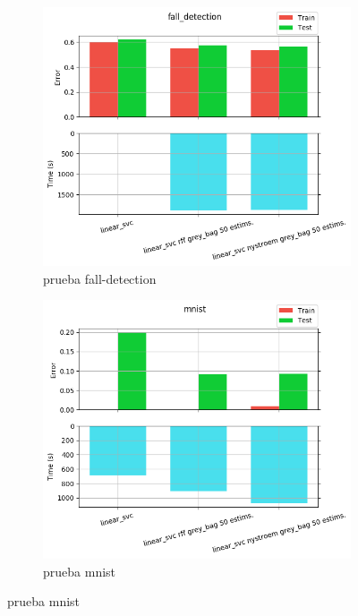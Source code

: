 \begin{figure}[ht]
  \centering
  \begin{subfigure}[b]{0.5\linewidth}
    \centering\includegraphics[width=\imgscale\linewidth]{Figures/2_7/fall_detection}
    \caption{prueba fall-detection}
    \label{fig:2_7_fall_detection}
  \end{subfigure}%
  \begin{subfigure}[b]{0.5\linewidth}
    \centering\includegraphics[width=\imgscale\linewidth]{Figures/2_7/mnist}
    \caption{prueba mnist}
    \label{fig:2_7_mnist}
  \end{subfigure}
\end{figure}



